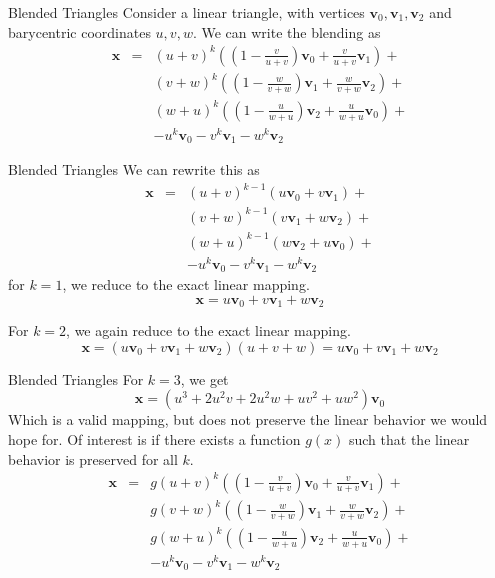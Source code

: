 \documentclass[12pt]{beamer}
\begin{document}
\begin{frame}{Blended Triangles}
Consider a linear triangle, with vertices $\mathbf{v}_0,\mathbf{v}_1,\mathbf{v}_2$ and barycentric coordinates $u,v,w$. We can write the blending as
\begin{eqnarray*}
\mathbf{x} & = &(u+v)^k\left(\left(1-\frac{v}{u+v}\right)\mathbf{v}_0 + \frac{v}{u+v}\mathbf{v}_1\right) + \\
&&(v+w)^k\left(\left(1-\frac{w}{v+w}\right)\mathbf{v}_1 + \frac{w}{v+w}\mathbf{v}_2\right) + \\
&&(w+u)^k\left(\left(1-\frac{u}{w+u}\right)\mathbf{v}_2 + \frac{u}{w+u}\mathbf{v}_0\right) + \\
&&-u^k\mathbf{v}_0-v^k\mathbf{v}_1-w^k\mathbf{v}_2
\end{eqnarray*}
\end{frame}
\begin{frame}{Blended Triangles}
We can rewrite this as
\begin{eqnarray*}
\mathbf{x} & = &(u+v)^{k-1}\left(u\mathbf{v}_0 + v\mathbf{v}_1\right) + \\
&&(v+w)^{k-1}\left(v\mathbf{v}_1 + w\mathbf{v}_2\right) + \\
&&(w+u)^{k-1}\left(w\mathbf{v}_2 + u\mathbf{v}_0\right) + \\
&&-u^k\mathbf{v}_0-v^k\mathbf{v}_1-w^k\mathbf{v}_2
\end{eqnarray*}
for $k = 1$, we reduce to the exact linear mapping.
\[
\mathbf{x} = u\mathbf{v}_0+v\mathbf{v}_1+w\mathbf{v}_2
\]

For $k = 2$, we again reduce to the exact linear mapping.
\[
\mathbf{x} = (u\mathbf{v}_0+v\mathbf{v}_1+w\mathbf{v}_2)(u+v+w) = u\mathbf{v}_0+v\mathbf{v}_1+w\mathbf{v}_2
\]
\end{frame}
\begin{frame}{Blended Triangles}
For $k = 3$, we get
\[
\mathbf{x} = (u^3 + 2u^2v + 2u^2w + uv^2 + uw^2)\mathbf{v}_0
\]
Which is a valid mapping, but does not preserve the linear behavior we would hope for.
Of interest is if there exists a function $g(x)$ such that the linear behavior is preserved for all $k$.
\begin{eqnarray*}
\mathbf{x} & = &g(u+v)^k\left(\left(1-\frac{v}{u+v}\right)\mathbf{v}_0 + \frac{v}{u+v}\mathbf{v}_1\right) + \\
&&g(v+w)^k\left(\left(1-\frac{w}{v+w}\right)\mathbf{v}_1 + \frac{w}{v+w}\mathbf{v}_2\right) + \\
&&g(w+u)^k\left(\left(1-\frac{u}{w+u}\right)\mathbf{v}_2 + \frac{u}{w+u}\mathbf{v}_0\right) + \\
&&-u^k\mathbf{v}_0-v^k\mathbf{v}_1-w^k\mathbf{v}_2
\end{eqnarray*}
\end{frame}
\end{document}
